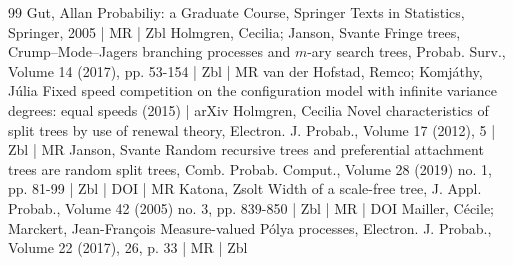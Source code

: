 \begin{thebibliography}{99}
 Gut, Allan Probabiliy: a Graduate Course, Springer Texts in Statistics, Springer, 2005 | MR | Zbl
 Holmgren, Cecilia; Janson, Svante Fringe trees, Crump–Mode–Jagers branching processes and $m$-ary search trees, Probab. Surv., Volume 14 (2017), pp. 53-154 | Zbl | MR
 van der Hofstad, Remco; Komjáthy, Júlia Fixed speed competition on the configuration model with infinite variance degrees: equal speeds (2015) | arXiv
 Holmgren, Cecilia Novel characteristics of split trees by use of renewal theory, Electron. J. Probab., Volume 17 (2012), 5 | Zbl | MR
 Janson, Svante Random recursive trees and preferential attachment trees are random split trees, Comb. Probab. Comput., Volume 28 (2019) no. 1, pp. 81-99 | Zbl | DOI | MR
 Katona, Zsolt Width of a scale-free tree, J. Appl. Probab., Volume 42 (2005) no. 3, pp. 839-850 | Zbl | MR | DOI
 Mailler, Cécile; Marckert, Jean-François Measure-valued Pólya processes, Electron. J. Probab., Volume 22 (2017), 26, p. 33 | MR | Zbl
\end{thebibliography}

